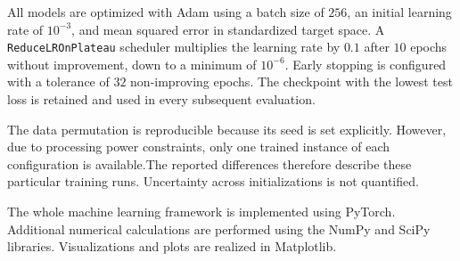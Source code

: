 All models are optimized with Adam using a batch size of $256$, an initial learning rate of $10^{-3}$, and mean squared error in standardized target space.\cite{kingma2017adammethodstochasticoptimization}
A \texttt{ReduceLROnPlateau} scheduler multiplies the learning rate by $0.1$ after $10$ epochs without improvement, down to a minimum of $10^{-6}$. Early stopping is configured with a tolerance of $32$ non-improving epochs. The checkpoint with the lowest test loss is retained and used in every subsequent evaluation.\cite{bottou2018optimization}

The data permutation is reproducible because its seed is set explicitly. However, due to processing power constraints, only one trained instance of each configuration is available.The reported differences therefore describe these particular training runs. Uncertainty across initializations is not quantified.

The whole machine learning framework is implemented using PyTorch.\cite{paszke2019pytorch}
Additional numerical calculations are performed using the NumPy and SciPy libraries.\cite{harris2020array}\cite{virtanen2020scipy}
Visualizations and plots are realized in Matplotlib.\cite{hunter2007matplotlib}
